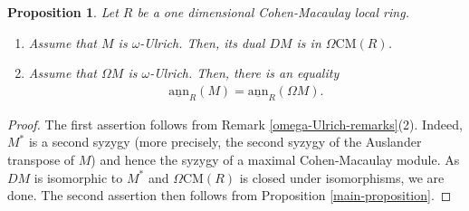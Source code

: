 \documentclass[12pt]{amsart}
\newcommand{\sann}{\underline{\mathrm{ann}}}
\newcommand{\CM}{\mathrm{CM}}
\newtheorem{proposition}[theorem]{Proposition}
\theoremstyle{definition}
\numberwithin{equation}{theorem}
\begin{document}
\begin{proposition}\label{proposition-omega-ulrich}
    Let $R$ be a one dimensional Cohen-Macaulay local ring.
    \begin{enumerate}
        \item Assume that $M$ is $\omega$-Ulrich. Then, its dual $DM$ is in $\Omega\CM(R)$.
        \item Assume that $\Omega M$ is $\omega$-Ulrich. Then, there is an equality 
        \begin{align*}
        \sann_R(M) = \sann_R(\Omega M).
        \end{align*}
    \end{enumerate}
\end{proposition}
\begin{proof}
    The first assertion follows from Remark \ref{omega-Ulrich-remarks}(2). Indeed, $M^*$ is a second syzygy (more precisely, the second syzygy of the Auslander transpose of $M$) and hence the syzygy of a maximal Cohen-Macaulay module. As $DM$ is isomorphic to $M^*$ and $\Omega \CM(R)$ is closed under isomorphisms, we are done. The second assertion then follows from Proposition \ref{main-proposition}.
\end{proof}
\end{document}

